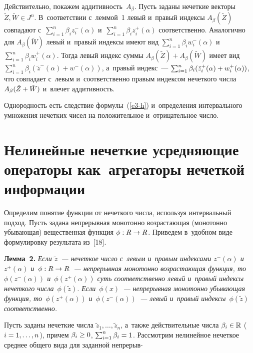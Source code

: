 \begin{multicols}{2}
\smallskip

Действительно, покажем аддитивность~$A_{\beta}$. Пусть заданы нечеткие векторы 
$\tilde{Z}, \tilde{W}\in J^n$.  В~соответствии с~леммой~1 левый и~правый индексы 
$A_{\beta}(\tilde{Z})$ совпадают с~$\sum\nolimits_{i=1}^n\beta_iz^{-}_i(\alpha)$ 
и~$\sum\nolimits_{i=1}^n\beta_iz^{+}_i(\alpha)$ соответственно. Аналогично для 
$A_{\beta}(\tilde{W})$ левый и~правый индексы имеют вид 
$\sum\nolimits_{i=1}^n\beta_iw^{-}_i(\alpha)$ 
и~$\sum\nolimits_{i=1}^n\beta_iw^{+}_i(\alpha)$. Тогда левый индекс суммы 
$A_{\beta}(\tilde{Z})+A_{\beta}(\tilde{W})$ имеет вид 
$\sum\nolimits_{i=1}^n\beta_i(\tilde{z}^{-}(\alpha) + w^{-}(\alpha))$, а~правый 
индекс~--- $\sum\nolimits_{i=1}^n\beta_i(\tilde{z}^{+}_i(\alpha)\hm + 
w^{+}_i(\alpha))$, что совпадает с~левым и~соответственно правым индексом 
нечеткого чис\-ла $A_{\beta}(\tilde{Z}\hm+\tilde{W})$ и~влечет аддитивность.

Однородность есть следствие формулы~(\ref{e3-h}) и~определения интервального умножения 
нечетких чисел на положительное и~отрицательное число.


\section{Нелинейные  нечеткие усредняющие операторы как~агрегаторы нечеткой 
информации}

 Определим понятие функции от нечеткого чис\-ла, используя интервальный подход.  
Пусть задана непрерывная монотонно возрастающая (монотонно убывающая) 
вещественная функция $\phi: R\hm\rightarrow R$. Приведем в~удобном  виде 
формулировку результата из~[18].

\smallskip

\textbf{Лемма~2.} \textit{Если  $\tilde{z}$~--- нечеткое чис\-ло  с~левым и~правым 
индексами $z^{-}(\alpha)$ и~$z^{+}(\alpha)$  и~$\phi: R\hm\rightarrow R$~--- 
непрерывная монотонно возрастающая функция, то $\phi(z^{-}(\alpha))$ 
и~$\phi(z^{+}(\alpha))$ суть соответственно  левый и~правый индексы  нечеткого 
чис\-ла~$\phi(\tilde{z})$. Если~$\phi(x)$~--- непрерывная монотонно убывающая 
функция, то~$\phi(z^{+}(\alpha))$ и~$\phi(z^{-}(\alpha))$~--- левый и~правый 
индексы~$\phi(\tilde{z})$ соответственно.}

\smallskip


Пусть заданы нечеткие чис\-ла $\tilde{z}_1,\ldots, \tilde{z}_n$, а~также 
действительные чис\-ла $\beta_i\hm\in \mathbb{R}$ ($i \hm= 1,\ldots, n$), причем $ \beta_i \hm\geq 
0$, $\sum\nolimits_{i=1}^n\beta_i\hm=1$. Рассмотрим нелинейное нечеткое среднее 
общего вида  для заданной непрерыв-\linebreak\vspace*{-12pt}


\end{multicols}
